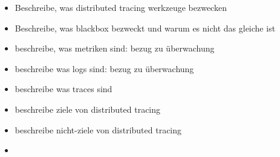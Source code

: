 \begin{itemize}
	\item Beschreibe, was distributed tracing werkzeuge bezwecken
	\item Beschreibe, was blackbox bezweckt und warum es nicht das gleiche ist
	\item beschreibe, was metriken sind: bezug zu überwachung
	\item beschreibe was logs sind: bezug zu überwachung
	\item beschreibe was traces sind
	\item beschreibe ziele von distributed tracing
	\item beschreibe nicht-ziele von distributed tracing
	\item 
\end{itemize}
 
 
